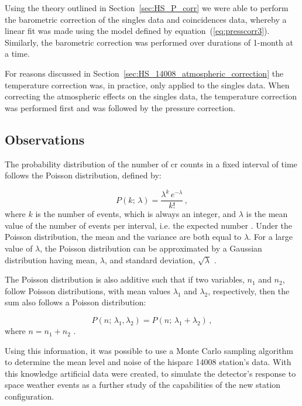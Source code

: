 Using the theory outlined in Section~\ref{sec:HS_P_corr} we were able to perform the barometric correction of the singles data and coincidences data, whereby a linear fit was made using the model defined by equation~(\ref{eq:presscorr3}). Similarly, the barometric correction was performed over durations of 1-month at a time.

For reasons discussed in Section~\ref{sec:HS_14008_atmospheric_correction} the temperature correction was, in practice, only applied to the singles data. When correcting the atmospheric effects on the singles data, the temperature correction was performed first and was followed by the pressure correction.



\subsection{Observations}\label{sec:HS_14008_method_obs}

The probability distribution of the number of \gls{cr} counts in a fixed interval of time follows the Poisson distribution, defined by:

\begin{equation}
P(k; \, \lambda) = \frac{\lambda^k \, e^{-\lambda}}{k!} \, ,
\label{eq:poisson_PDF}
\end{equation}
%
where $k$ is the number of events, which is always an integer, and $\lambda$ is the mean value of the number of events per interval, i.e. the expected number \citep{lista_statistical_2016}. Under the Poisson distribution, the mean and the variance are both equal to $\lambda$. For a large value of $\lambda$, the Poisson distribution can be approximated by a Gaussian distribution having mean, $\lambda$, and standard deviation, $\sqrt{\lambda}$ \citep{lista_statistical_2016}.

The Poisson distribution is also additive such that if two variables, $n_1$ and $n_2$, follow Poisson distributions, with mean values $\lambda_1$ and $\lambda_2$, respectively, then the sum also follows a Poisson distribution:

\begin{equation}
P(n; \, \lambda_1, \lambda_2) = P(n; \, \lambda_1 + \lambda_2) \, ,
\label{eq:poisson_additive_PDF}
\end{equation}
%
where $n = n_1 + n_2$ \citep{lista_statistical_2016}.

Using this information, it was possible to use a Monte Carlo sampling algorithm to determine the mean level and noise of the \gls{hisparc} 14008 station's data. With this knowledge artificial data were created, to simulate the detector's response to space weather events as a further study of the capabilities of the new station configuration. 

